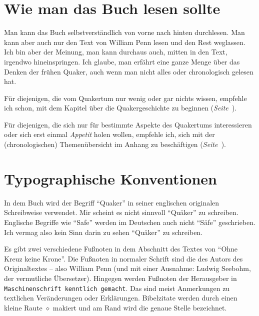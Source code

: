 \chapter{Wie man das Buch lesen sollte}

Man kann das Buch selbstverständlich von vorne nach hinten durchlesen. Man kann aber auch nur den Text
von William Penn lesen und den Rest weglassen. Ich bin aber der Meinung, man kann
durchaus auch, mitten in den Text, irgendwo hineinspringen. Ich glaube, man
erfährt eine ganze Menge über das Denken der frühen Quaker, auch wenn man nicht
alles oder chronologisch gelesen hat.

\medskip

Für diejenigen, die vom Quakertum nur wenig oder gar nichts wissen, empfehle ich
 schon, mit dem Kapitel über die Quakergeschichte zu beginnen
 (\textit{Seite~\pageref{ref:entwicklung_quakertum}}).

\medskip

Für diejenigen, die sich nur für bestimmte Aspekte des Quakertums interessieren oder
sich erst einmal \textit{Appetit} holen wollen, empfehle ich, sich mit der
(chronologischen) Themenübersicht im Anhang zu beschäftigen
(\textit{Seite~\pageref{ref:theme_nuebersicht}}).

\chapter{Typographische Konventionen}

In dem Buch wird der Begriff "`Quaker"'  in seiner
englischen originalen Schreibweise verwendet. Mir scheint es nicht sinnvoll
"`Quäker"' zu schreiben. Englische Begriffe wie "`Safe"' werden im Deutschen
auch nicht "`Säfe"' geschrieben. Ich vermag also kein Sinn darin zu sehen
"`Quäker"' zu schreiben.

\medskip


Es gibt zwei verschiedene Fußnoten in dem Abschnitt des Textes von "`Ohne Kreuz
keine Krone"'. Die Fußnoten in normaler Schrift sind die des Autors des
Originaltextes -- also William Penn (und mit einer Ausnahme: Ludwig Seebohm, der vermutliche Übersetzer).
Hingegen werden Fußnoten der Herausgeber in
\texttt{Maschinenschrift kenntlich gemacht}. Das sind meist Anmerkungen zu
textlichen Veränderungen oder Erklärungen. Bibelzitate werden durch einen kleine Raute $\diamond$ makiert und am Rand wird die genaue Stelle bezeichnet.

\medskip

